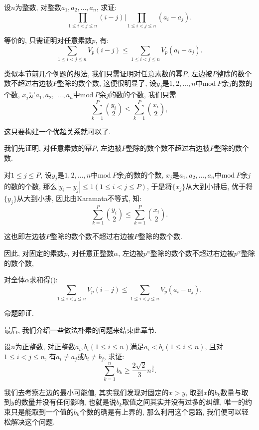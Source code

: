 \documentclass[lang=cn,12pt,thmcnt=section]{elegantbook}
\renewcommand{\note}[1]{({\kaishu\dashuline{#1}})}
\begin{document}
\begin{example}
设$n$为整数, 对整数$a_1,a_2,\dots{},a_n$, 求证: 
\[
\prod_{1\le i<j\le n}(i-j)|\prod_{1\le i<j\le n}(a_i-a_j).
\]
\end{example}

\begin{analysis}
等价的, 只需证明对任意素数$p$, 有: 
\[
\sum_{1\le i<j\le n}V_p(i-j)\le \sum_{1\le i<j\le n}V_p(a_i-a_j).
\]

类似本节前几个例题的想法, 我们只需证明对任意素数的幂$P$, 左边被$P$整除的数个数不超过右边被$P$整除的数个数, 这便很明显了, 设$y_j$是$1,2,\dots{},n$中$\mathrm{mod}\ P$余$j$的数的个数, $x_j$是$a_1,a_2,$ $\dots,a_n$中$\mathrm{mod}\ P$余$j$的数的个数, 我们只需
\[
\sum_{k=1}^P \binom{y_i}{2}\le \sum_{k=1}^P \binom{x_i}{2},
\]

这只要构建一个优超关系就可以了.
\end{analysis}

\begin{solution}
我们先证明, 对任意素数的幂$P$, 左边被$P$整除的数个数不超过右边被$P$整除的数个数.

对$1\le j\le P$, 设$y_j$是$1,2,\dots{},n$中$\mathrm{mod}\ P$余$j$的数的个数, $x_j$是$a_1,a_2,\dots{},a_n$中$\mathrm{mod}\ P$余$j$的数的个数, 那么$|y_i-y_j|\le 1(1\le i<j\le P)$, 于是将$\{x_j\}$从大到小排后, 优于将$\{y_j\}$从大到小排, 因此由Karamata不等式, 知: 
\[
\sum_{k=1}^P \binom{y_i}{2}\le \sum_{k=1}^P \binom{x_i}{2}.
\]

这也即左边被$P$整除的数个数不超过右边被$P$整除的数个数.

因此, 对固定的素数$p$, 对任意正整数$\alpha$, 左边被$p^\alpha$整除的数个数不超过右边被$p^\alpha$整除的数个数, 

对全体$\alpha$求和得\note{因为$V_p(x)=\sum_{\alpha=1}^{\infty}\mathbf{1}_{p^\alpha|x}$}: 
\[
\sum_{1\le i<j\le n}V_p(i-j)\le \sum_{1\le i<j\le n}V_p(a_i-a_j),
\]

命题即证.
\end{solution}

最后, 我们介绍一些做法朴素的问题来结束此章节.

\begin{example}
设$n$为正整数, 对正整数$a_i,b_i(1\le i\le n)$满足$a_i<b_i(1\le i\le n)$, 且对$1\le i<j\le n$, 有$a_i\ne a_j$或$b_i\ne b_j$, 求证: 
\[
\sum_{k=1}^n b_k\ge \frac{2\sqrt{2}}{3}n^{\frac{3}{2}}.
\]
\end{example}

\begin{analysis}
我们去考察左边的最小可能值, 其实我们发现对固定的$x>y$, 取到$x$的$b_k$数量与取到$y$的数量并没有任何影响, 也就是说$b_k$取值之间其实并没有过多的纠缠, 唯一的约束只是能取到一个值的$b_k$个数的确是有上界的, 那么利用这个思路, 我们便可以轻松解决这个问题.
\end{analysis}
\end{document}
